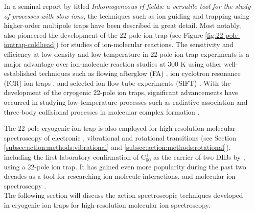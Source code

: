 In a seminal report by \citet{gerlich_inhomogeneous_1992} titled \emph{Inhomogeneous rf fields: a versatile tool for the study of processes with slow ions}, the techniques such as ion guiding and trapping using higher-order multipole traps have been described in great detail. Most notably, \citet{gerlich_ion-neutral_1995} also pioneered the development of the 22-pole ion trap (see Figure \ref{fig:22-pole-iontrap-coldhead}) for studies of ion-molecular reactions. The sensitivity and efficiency at low density and low temperature in 22-pole ion trap experiments is a major advantage over ion-molecule reaction studies at 300 K using other well-established techniques such as flowing afterglow (FA) \cite{fehsenfeld_thermalenergy_1967}, ion cyclotron resonance (ICR) ion traps \cite{kim_icr_1975}, and selected ion flow tube experiments (SIFT) \cite{smith_laboratory_1978}. With the development of the cryogenic 22-pole ion traps, significant advancements have occurred in studying low-temperature processes such as radiative association and three-body collisional processes in molecular complex formation \cite{gerlich_experimental_1992, paul_dynamics_1995, paul_deuteration_1996}.

The 22-pole cryogenic ion trap is also employed for high-resolution molecular spectroscopy of electronic \cite{chakrabarty_novel_2013, campbell_laboratory_2015}, vibrational \cite{asvany_understanding_2005} and rotational \cite{Brunken2017} transitions (see Section \ref{subsec:action:methods:vibrational} and \ref{subsec:action:methods:rotational}), including the first laboratory confirmation of C$_{60}^+$ as the carrier of two DIBs by \citet{campbell_laboratory_2015}, using a 22-pole ion trap. It has gained even more popularity during the past two decades as a tool for researching ion-molecule interactions, and molecular ion spectroscopy  \cite{redwine_novel_2013, asvany_coltrap_2014, gunther_berlintrap_2017, jusko_felion_2019, rap_low-temperature_2022}.\\

The following section will discuss the action spectroscopic techniques developed in cryogenic ion traps for high-resolution molecular ion spectroscopy.